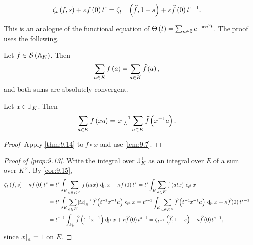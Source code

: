 \pagebreak

\begin{proposition}
\label{prop:9.13}
$$ \zeta_t\br{f, s} + \kappa f\br{0}t^s = \zeta_{t^{-1}}\br{\widehat{f}, 1 - s} + \kappa\widehat{f}\br{0}t^{s - 1}. $$
\end{proposition}

This is an analogue of the functional equation of $ \Theta\br{t} = \sum_{n \in \ZZ} e^{-\pi n^2t} $. The proof uses the following.

\begin{theorem}
\label{thm:9.14}
Let $ f \in \SSS\br{\AA_K} $. Then
$$ \sum_{a \in K} f\br{a} = \sum_{a \in K} \widehat{f}\br{a}, $$
and both sums are absolutely convergent.
\end{theorem}

\begin{corollary}
\label{cor:9.15}
Let $ x \in \mathbb{J}_K $. Then
$$ \sum_{a \in K} f\br{xa} = \abs{x}_\AA^{-1}\sum_{a \in K} \widehat{f}\br{x^{-1}a}. $$
\end{corollary}

\begin{proof}
Apply \ref{thm:9.14} to $ f \circ x $ and use \ref{lem:9.7}.
\end{proof}

\begin{proof}[Proof of \ref{prop:9.13}]
Write the integral over $ \mathbb{J}_K^1 $ as an integral over $ E $ of a sum over $ K^\times $. By \ref{cor:9.15},
\begin{align*}
\zeta_t\br{f, s} + \kappa f\br{0}t^s
& = t^s\intJI[E]{\sum_{a \in K^\times} f\br{atx}}{x} + \kappa f\br{0}t^s
= t^s\intJI[E]{\sum_{a \in K} f\br{atx}}{x} \\
& = t^s\intJI[E]{\sum_{a \in K} \abs{tx}_\AA^{-1}\widehat{f}\br{t^{-1}x^{-1}a}}{x}
= t^{s - 1}\intJI[E]{\sum_{a \in K^\times} \widehat{f}\br{t^{-1}x^{-1}a}}{x} + \kappa\widehat{f}\br{0}t^{s - 1} \\
& = t^{s - 1}\intJI{\widehat{f}\br{t^{-1}x^{-1}}}{x} + \kappa\widehat{f}\br{0}t^{s - 1}
= \zeta_{t^{-1}}\br{\widehat{f}, 1 - s} + \kappa\widehat{f}\br{0}t^{s - 1},
\end{align*}
since $ \abs{x}_{\mathbb{A}} = 1 $ on $ E $.
\end{proof}

